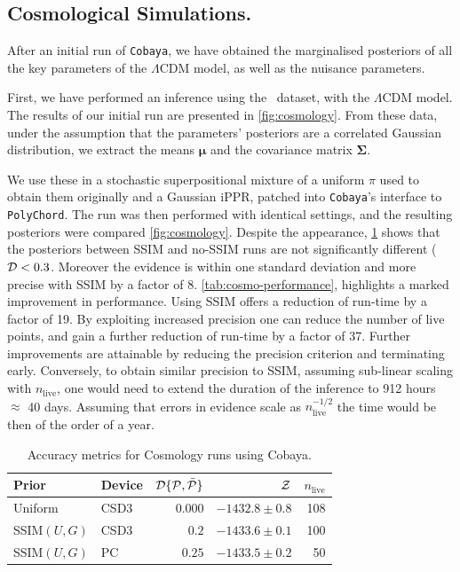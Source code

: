 \documentclass[usenatbib]{mnras}
\begin{document}
\subsection{Cosmological Simulations.}\label{sec:orgb81c159}
After an initial run of \texttt{Cobaya}, we have obtained the marginalised
posteriors of all the key parameters of the \(\Lambda\)CDM model,
as well as the nuisance parameters.

First, we have performed an inference using the~\cite{Planck} dataset,
with the \(\Lambda\)CDM model. The results of our initial run are
presented in \cref{fig:cosmology}. From these data, under the
assumption that the parameters' posteriors are a correlated Gaussian
distribution, we extract the means $\bm{\mu}$ and the covariance
matrix \(\bm{\Sigma}\).

We use these in a stochastic superpositional mixture of a uniform
$\pi$ used to obtain them originally and a Gaussian iPPR, patched into
\texttt{Cobaya}'s interface to \texttt{PolyChord}. The run was then
performed with identical settings, and the resulting posteriors were
compared \cref{fig:cosmology}. Despite the appearance,
\cref{tab:cosmo-accuracy} shows that the posteriors between SSIM and
no-SSIM runs are not significantly different (${\cal D}<
0.3$. Moreover the evidence is within one standard deviation and more
precise with SSIM by a factor of 8. \cref{tab:cosmo-performance},
highlights a marked improvement in performance. Using SSIM offers a
reduction of run-time by a factor of 19. By exploiting increased
precision one can reduce the number of live points, and gain a further
reduction of run-time by a factor of 37. Further improvements are
attainable by reducing the precision criterion and terminating
early. Conversely, to obtain similar precision to SSIM, assuming
sub-linear scaling with \(n_\text{live}\), one would need to extend
the duration of the inference to 912 hours \(\approx\) 40
days. Assuming that errors in evidence scale as
\(n_\text{live}^{-1/2}\) the time would be then of the order of a
year.


\begin{table}
  \centering
  \caption{Accuracy metrics for Cosmology runs using Cobaya.}
  \begin{tabular}{llrrr}
    \textbf{Prior} & \textbf{Device} & ${\cal D}\{ {\cal P}, \bar{\cal P}\}$ & ${\cal Z}$ & $n_\text{live}$\\
    \hline
    Uniform & CSD3 &\( 0.000\) & \(-1432.8 \pm 0.8\) & 108\\
    SSIM\((U, G)\) & CSD3 & \(0.2\) & \(-1433.6 \pm 0.1\) & 100\\
    SSIM\((U, G)\) & PC & \(0.25\) & \(-1433.5 \pm 0.2\) & 50
  \end{tabular}
  \label{tab:cosmo-accuracy}
\end{table}
\end{document}
